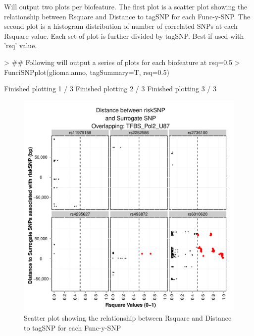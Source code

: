 \documentclass[a4paper]{article}
\begin{document}
Will output two plots per biofeature. The first plot is a scatter plot showing 
the relationship between Rsquare and Distance to tagSNP for each Func-y-SNP. The
 second plot is a histogram distribution of number of correlated SNPs at each 
 Rsquare value. Each set of plot is further divided by tagSNP. Best if used with
  'rsq' value.
\begin{Schunk}
\begin{Sinput}
> ## Following will output a series of plots for each biofeature at rsq=0.5
> FunciSNPplot(glioma.anno, tagSummary=T, rsq=0.5)
\end{Sinput}
\begin{Soutput}
Finished plotting  1 / 3 
Finished plotting  2 / 3 
Finished plotting  3 / 3 
\end{Soutput}
\end{Schunk}
\begin{figure}[ht!]
\begin{center}
\includegraphics{FunciSNP.0.1.7/plots/TFBS_Pol2_U87_R2vsDist_riskSNP.pdf}
\caption{\label{fig:TFBS_Pol2_U87_R2vsDist_riskSNP.pdf} Scatter plot 
showing the relationship between Rsquare and Distance to tagSNP for each 
Func-y-SNP}
{\footnotesize{}}
\end{center}
\end{figure}
\end{document}
